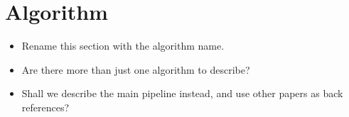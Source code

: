 \section{Algorithm}
\begin{itemize}
\item Rename this section with the algorithm name.
\item Are there more than just one algorithm to describe?
\item Shall we describe the main pipeline instead, and use other papers as back references?
\end{itemize}